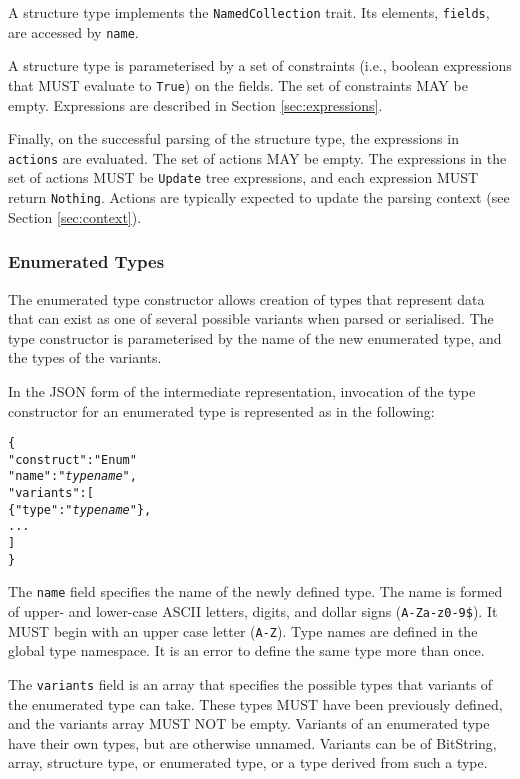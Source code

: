 \documentclass[10pt,twocolumn,a4paper]{article}
\newcommand{\code}[1]{\texttt{#1}}
\begin{document}
A structure type implements the \code{NamedCollection} trait. Its elements,
\code{fields}, are accessed by \code{name}.

A structure type is parameterised by a set of constraints (i.e., boolean
expressions that MUST evaluate to \code{True}) on the
fields. The set of constraints MAY be empty. Expressions are described in
Section \ref{sec:expressions}.

Finally, on the successful parsing of the structure type, the expressions
in \code{actions} are evaluated. The set of actions MAY be empty. The
expressions in the set of actions MUST be \code{Update} tree expressions,
and each expression MUST return \code{Nothing}. Actions are typically
expected to update the parsing context (see Section \ref{sec:context}).

\subsubsection{Enumerated Types}

The enumerated type constructor allows creation of types that represent
data that can exist as one of several possible variants when parsed or
serialised. The type constructor is parameterised by the name of the new
enumerated type, and the types of the variants.

In the JSON form of the intermediate representation, invocation of the type
constructor for an enumerated type is represented as in the following:
\footnotesize
\begin{alltt}
  \{
    "construct"   : "Enum"
    "name"        : "\emph{type name}",
    "variants"    : [
      \{"type" : "\emph{type name}"\},
      ...
    ]
  \}
\end{alltt}
\normalsize
The \code{name} field specifies the name of the newly defined type. The
name is formed of upper- and lower-case ASCII letters, digits, and dollar
signs (\code{A-Za-z0-9\$}).  It MUST begin with an upper case letter
(\code{A-Z}). Type names are defined in the global type namespace.
It is an error to define the same type more than once.

The \code{variants} field is an array that specifies the possible types
that variants of the enumerated type can take. These types MUST have been
previously defined, and the variants array MUST NOT be empty. Variants of
an enumerated type have their own types, but are otherwise unnamed.
Variants can be of BitString, array, structure type, or enumerated type, or
a type derived from such a type.
\end{document}
